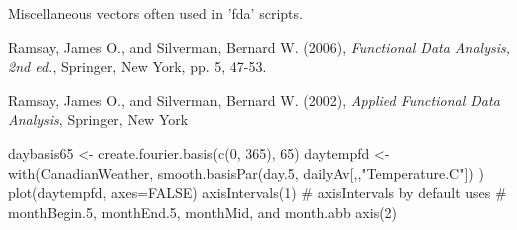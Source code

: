 \begin{Details}\relax
Miscellaneous vectors often used in 'fda' scripts.
\end{Details}
\begin{Source}\relax
Ramsay, James O., and Silverman, Bernard W. (2006), \emph{Functional
Data Analysis, 2nd ed.}, Springer, New York, pp. 5, 47-53.

Ramsay, James O., and Silverman, Bernard W. (2002), \emph{Applied
Functional Data Analysis}, Springer, New York
\end{Source}
\begin{SeeAlso}\relax
{} 
\end{SeeAlso}
\begin{Examples}
\begin{ExampleCode}
daybasis65 <- create.fourier.basis(c(0, 365), 65)
daytempfd <- with(CanadianWeather, smooth.basisPar(day.5, 
    dailyAv[,,"Temperature.C"]) )
plot(daytempfd, axes=FALSE)
axisIntervals(1) 
# axisIntervals by default uses
# monthBegin.5, monthEnd.5, monthMid, and month.abb
axis(2)  
\end{ExampleCode}
\end{Examples}

